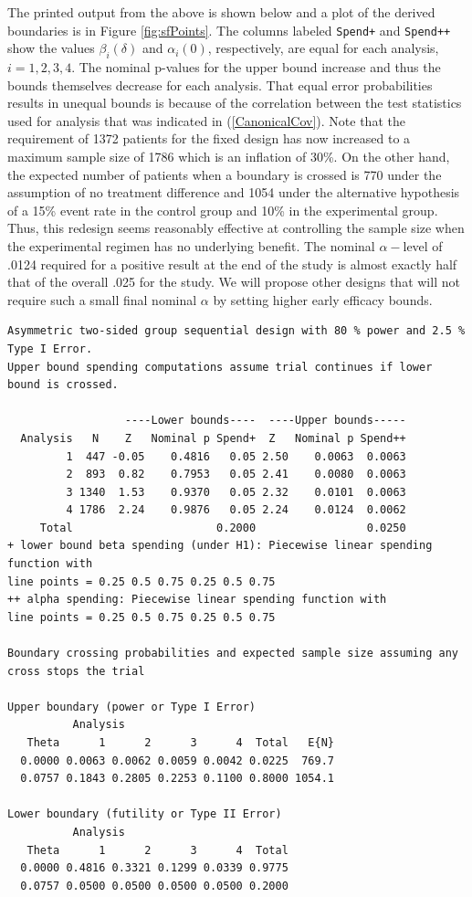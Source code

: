 The printed output from the above is shown below and a plot of the derived boundaries is in Figure \ref{fig:sfPoints}. 
The columns labeled \texttt{Spend+} and \texttt{Spend++} show the values $\beta_i(\delta)$ and $\alpha_i(0)$, respectively, are equal for each analysis, $i=1,2,3,4$.
The nominal p-values for the upper bound increase and thus the bounds themselves decrease for each analysis.
That equal error probabilities results in unequal bounds is because of the correlation between the test statistics used for analysis that was indicated in (\ref{CanonicalCov}).
Note that the requirement of 1372 patients for the fixed design has now increased to a maximum sample size of 1786 which is an inflation of 30\%.
On the other hand, the expected number of patients when a boundary is crossed is 770 under the assumption of no treatment difference and 1054 under the alternative hypothesis of a 15\% event rate in the control group and 10\% in the experimental group.
Thus, this redesign seems reasonably effective at controlling the sample size when the experimental regimen has no underlying benefit.
The nominal $\alpha-$level of .0124 required for a positive result at the end of the study is almost exactly half that of the overall .025 for the study.
We will propose other designs that will not require such a small final nominal $\alpha$ by setting higher early efficacy bounds.
\bigskip

\begin{verbatim}
Asymmetric two-sided group sequential design with 80 % power and 2.5 % Type I Error.
Upper bound spending computations assume trial continues if lower bound is crossed.

                  ----Lower bounds----  ----Upper bounds-----
  Analysis   N    Z   Nominal p Spend+  Z   Nominal p Spend++
         1  447 -0.05    0.4816   0.05 2.50    0.0063  0.0063
         2  893  0.82    0.7953   0.05 2.41    0.0080  0.0063
         3 1340  1.53    0.9370   0.05 2.32    0.0101  0.0063
         4 1786  2.24    0.9876   0.05 2.24    0.0124  0.0062
     Total                      0.2000                 0.0250 
+ lower bound beta spending (under H1): Piecewise linear spending function with 
line points = 0.25 0.5 0.75 0.25 0.5 0.75
++ alpha spending: Piecewise linear spending function with 
line points = 0.25 0.5 0.75 0.25 0.5 0.75

Boundary crossing probabilities and expected sample size assuming any cross stops the trial

Upper boundary (power or Type I Error)
          Analysis
   Theta      1      2      3      4  Total   E{N}
  0.0000 0.0063 0.0062 0.0059 0.0042 0.0225  769.7
  0.0757 0.1843 0.2805 0.2253 0.1100 0.8000 1054.1

Lower boundary (futility or Type II Error)
          Analysis
   Theta      1      2      3      4  Total
  0.0000 0.4816 0.3321 0.1299 0.0339 0.9775
  0.0757 0.0500 0.0500 0.0500 0.0500 0.2000
\end{verbatim}

